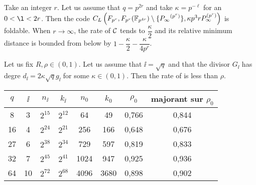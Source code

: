 \documentclass[10pt]{article}
\begin{document}
Take an integer $r$. Let us assume that $q=p^{2r}$ and take $\kappa=p^{-\ell}$ for an $0<\l<2r$. Then the code $C_L\left(F_{p^r},F_{p^r}( \mathbb{F}_{p^{4r}} )\setminus\{ {P_\infty}^{(p^r)} \}, \kappa p^3rP_\infty^{(p^r)}\right)$ is foldable. When $r \rightarrow \infty$, the rate of $\mathcal{C}$ tends to $\dfrac{\kappa}{2}$ and its relative minimum distance is bounded from below by $1-\dfrac{\kappa}{2}-\dfrac{\kappa}{4p^r}$.



\begin{proposition}
	Let us fix $R, \rho \in (0,1)$. Let us assume that $\ii =\sqrt{q}$ and that the divisor $G_{\ii}$ has degre $d_{\ii} = 2\kappa \sqrt{q}g_{\ii}$ for some $\kappa \in (0,1)$.
	Then the rate of  is less than $\rho$.
\end{proposition}




\newpage



\begin{center}
\begin{tabular}{|c|c|c|c|c|c|c|c|}
\hline
$q$ & $\ii$ & $n_{\ii}$ & $k_{\ii}$ & $n_0$ & $k_0$ & $\rho_0$ & majorant sur $\rho_0$ \\ 
\hline
8 & 3 & $2^{15}$ & $2^{12}$ & 64 & 49 & 0,766 & 0,844 \\
\hline
16 & 4 & $2^{24}$ & $2^{21}$ & 256 & 166 & 0,648 & 0,676 \\
\hline
27 & 6 & $2^{38}$ & $2^{34}$ & 729 & 597 & 0,819 & 0,833 \\
\hline
32 & 7 & $2^{45}$ & $2^{41}$ & 1024 & 947 & 0,925 & 0,936 \\
\hline
64 & 10 & $2^{72}$ & $2^{68}$ & 4096 & 3680 & 0,898 & 0,902 \\
\hline
\end{tabular}
\end{center}

\newpage



\end{document}
